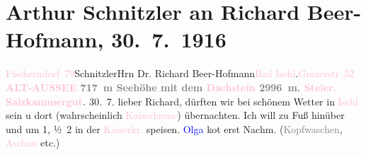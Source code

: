 

               \section[Arthur Schnitzler an Richard Beer-Hofmann, 30. 7. 1916]{ Arthur Schnitzler an Richard Beer-Hofmann, 30. 7. 1916}\nopagebreak{}\rehead{ }\normalsize\beginnumbering{} \toendnotes[C]{\smallbreak\pagebreak[2]} 
\toendnotes[C]{\smallbreak}\pstart{}{\pb}\textcolor{pink}{Fischerndorf 79}{}\ledrightnote{\textcolor{pink}{Fischerndorf}}\pend{}\pstart{}Schnitzler\pend{}{\bigskip}\pstart{}Hrn Dr. Richard Beer-Hofmann\pend{}\pstart{}\textcolor{pink}{Bad Ischl}{}\ledrightnote{\textcolor{pink}{Bad Ischl}}.\pend{}\pstart{}\textcolor{pink}{Grazerstr 52}{}\ledrightnote{\textcolor{pink}{Grazer Straße}}\pend{}{\bigskip}\pstart
           \noindent{}\centering{}{\pb}\textcolor{gray}{\textbf{\textcolor{pink}{ALT-AUSSEE}{}\ledrightnote{\textcolor{pink}{Altaussee}} 717 m Seehöhe mit dem \textcolor{pink}{Dachstein}{}\ledrightnote{\textcolor{pink}{Dachstein}}
                     2996 m. \textcolor{pink}{Steier. Salzkammergut}{}\ledrightnote{\textcolor{pink}{Salzkammergut}}.}}\pend
           \pstart
           \raggedleft{}{\pb}30. 7.\pend
           \pstart
           lieber Richard, \label{KLL02235_Beer-Hofmann-1v}\label{KLL02235_Beer-Hofmann-1h} dürften wir bei schönem Wetter in \textcolor{pink}{Ischl}{}\ledrightnote{\textcolor{pink}{Bad Ischl}} sein
               u dort (wahrscheinlich \textcolor{pink}{Kaiserkrone}{}\ledrightnote{\textcolor{pink}{Hotel Kaiserkrone}}) übernachten. Ich
               will zu Fuß hinüber und um 1, ½ 2 in der \textcolor{pink}{Kaiserkr.}{}\ledrightnote{\textcolor{pink}{Hotel Kaiserkrone}} speisen. \textcolor{blue}{Olga}{}\ledrightnote{\textcolor{blue}{Olga Schnitzler}} ko{\geminationm}t erst Nachm.
                  (\textcolor{gray}{Kopfwaschen}, \textcolor{pink}{Aschau}{}\ledrightnote{\textcolor{pink}{Aschau}} etc.)
